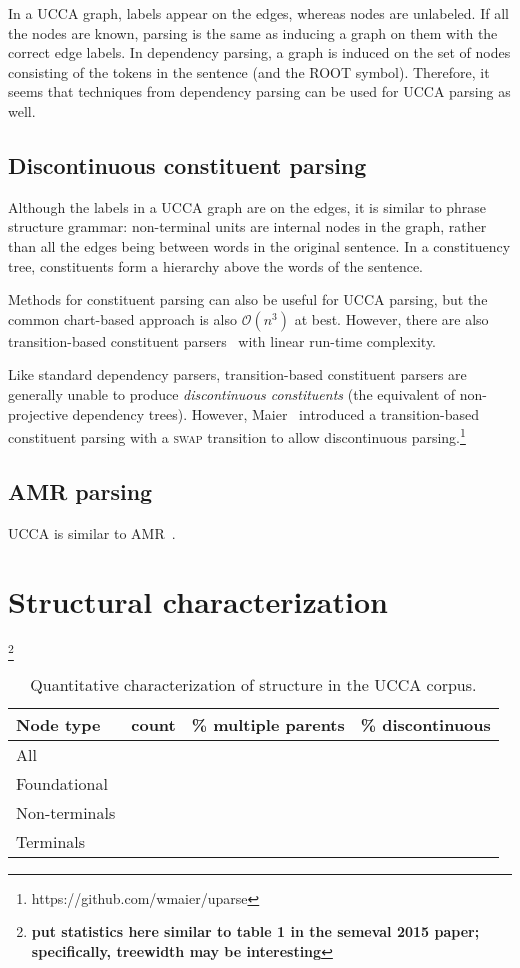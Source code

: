 \documentclass[11pt]{article}
\newcommand{\my}[1]{\footnote{\bf #1}}
\begin{document}
In a UCCA graph, labels appear on the edges, whereas nodes are unlabeled. If all the nodes are known, parsing is the same as inducing a graph on them with the correct edge labels. In dependency parsing, a graph is induced on the set of nodes consisting of the tokens in the sentence (and the \textsc{ROOT} symbol). Therefore, it seems that techniques from dependency parsing can be used for UCCA parsing as well.

\subsection{Discontinuous constituent parsing}

Although the labels in a UCCA graph are on the edges, it is similar to phrase structure grammar: non-terminal units are internal nodes in the graph, rather than all the edges being between words in the original sentence. In a constituency tree, constituents form a hierarchy above the words of the sentence.

Methods for constituent parsing can also be useful for UCCA parsing, but the common chart-based approach is also $\mathcal{O}(n^3)$ at best. However, there are also transition-based constituent parsers~\cite{zhu2013fast} with linear run-time complexity.

Like standard dependency parsers, transition-based constituent parsers are generally unable to produce \textit{discontinuous constituents} (the equivalent of non-projective dependency trees). However, Maier~ introduced a transition-based constituent parsing with a \textsc{swap} transition to allow discontinuous parsing.\footnote{https://github.com/wmaier/uparse}

\subsection{AMR parsing}

UCCA is similar to AMR~\cite{flanigan2014discriminative,artzi2015broad}.

\section{Structural characterization}

\my{put statistics here similar to table 1 in the semeval 2015 paper; specifically, treewidth may be interesting}

\begin{table}[ht]
\begin{tabular}{lccc}
Node type & count & \% multiple parents & \% discontinuous \\
\hline
All &  & \\
Foundational &  & \\
Non-terminals &  & \\
Terminals &  &
\end{tabular}
\caption{Quantitative characterization of structure in the UCCA corpus. 
}
\end{table}
\end{document}
